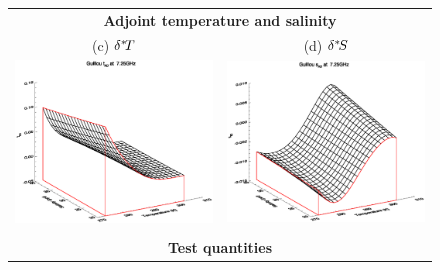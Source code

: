 \begin{figure}[htp]
\begin{tabular}{c c}
    \multicolumn{2}{c}{\sffamily\textbf{Adjoint temperature and salinity}}\\
    \textsf{(c)} $\delta^{*}\! {T}$ &
    \textsf{(d)} $\delta^{*}\! {S}$ \\
    \includegraphics[bb=125 240 508 540,clip,scale=0.5]{graphics/Guillou/TLAD/t_AD_7.25GHz.eps} &
    \includegraphics[bb=120 240 508 540,clip,scale=0.5]{graphics/Guillou/TLAD/s_AD_7.25GHz.eps} \\\\
    \multicolumn{2}{c}{\sffamily\textbf{Test quantities}}\\

\end{tabular}
\end{figure}
